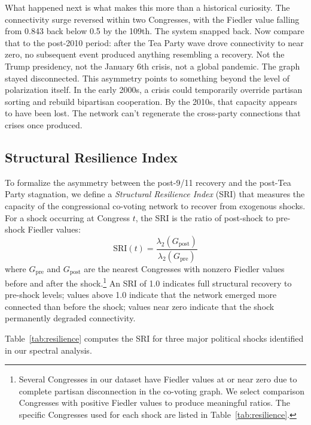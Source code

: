 \documentclass[12pt, a4paper]{article}
\begin{document}
What happened next is what makes this more than a historical curiosity. The connectivity surge reversed within two Congresses, with the Fiedler value falling from 0.843 back below 0.5 by the 109th. The system snapped back. Now compare that to the post-2010 period: after the Tea Party wave drove connectivity to near zero, no subsequent event produced anything resembling a recovery. Not the Trump presidency, not the January 6th crisis, not a global pandemic. The graph stayed disconnected. This asymmetry points to something beyond the level of polarization itself. In the early 2000s, a crisis could temporarily override partisan sorting and rebuild bipartisan cooperation. By the 2010s, that capacity appears to have been lost. The network can't regenerate the cross-party connections that crises once produced.

\subsection{Structural Resilience Index}

To formalize the asymmetry between the post-9/11 recovery and the post-Tea Party stagnation, we define a \textit{Structural Resilience Index} (SRI) that measures the capacity of the congressional co-voting network to recover from exogenous shocks. For a shock occurring at Congress $t$, the SRI is the ratio of post-shock to pre-shock Fiedler values:
\begin{equation}
    \text{SRI}(t) = \frac{\lambda_2(G_{\text{post}})}{\lambda_2(G_{\text{pre}})}
\end{equation}
where $G_{\text{pre}}$ and $G_{\text{post}}$ are the nearest Congresses with nonzero Fiedler values before and after the shock.\footnote{Several Congresses in our dataset have Fiedler values at or near zero due to complete partisan disconnection in the co-voting graph. We select comparison Congresses with positive Fiedler values to produce meaningful ratios. The specific Congresses used for each shock are listed in Table~\ref{tab:resilience}.} An SRI of 1.0 indicates full structural recovery to pre-shock levels; values above 1.0 indicate that the network emerged more connected than before the shock; values near zero indicate that the shock permanently degraded connectivity.

Table~\ref{tab:resilience} computes the SRI for three major political shocks identified in our spectral analysis.
\end{document}

